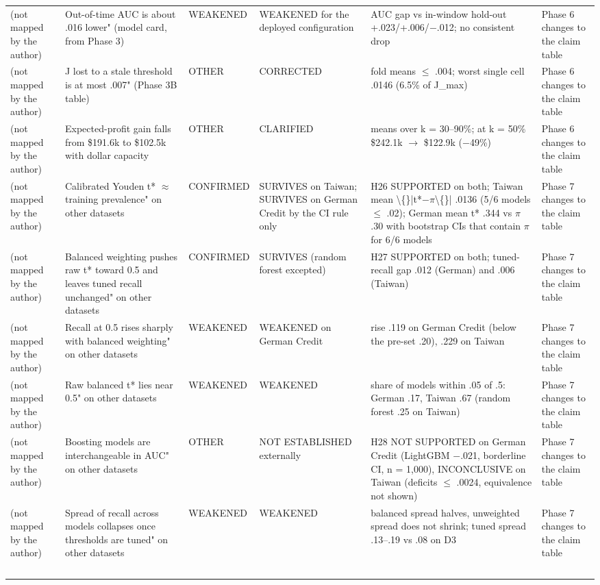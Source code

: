 \begin{table}[t]
\begin{tabular}{lp{5.2cm}lp{5.2cm}p{5.2cm}p{5.2cm}}
(not mapped by the author) & Out-of-time AUC is about .016 lower" (model card, from Phase 3) & WEAKENED & WEAKENED for the deployed configuration & AUC gap vs in-window hold-out +.023/+.006/$-$.012; no consistent drop & Phase 6 changes to the claim table \\
(not mapped by the author) & J lost to a stale threshold is at most .007" (Phase 3B table) & OTHER & CORRECTED & fold means $\leq$ .004; worst single cell .0146 (6.5\% of J\_max) & Phase 6 changes to the claim table \\
(not mapped by the author) & Expected-profit gain falls from \$191.6k to \$102.5k with dollar capacity & OTHER & CLARIFIED & means over k = 30--90\%; at k = 50\% \$242.1k $\to$ \$122.9k ($-$49\%) & Phase 6 changes to the claim table \\
(not mapped by the author) & Calibrated Youden t* $\approx$ training prevalence" on other datasets & CONFIRMED & SURVIVES on Taiwan; SURVIVES on German Credit by the CI rule only & H26 SUPPORTED on both; Taiwan mean \textbackslash\{\}|t*$-$$\pi$\textbackslash\{\}| .0136 (5/6 models $\leq$ .02); German mean t* .344 vs $\pi$ .30 with bootstrap CIs that contain $\pi$ for 6/6 models & Phase 7 changes to the claim table \\
(not mapped by the author) & Balanced weighting pushes raw t* toward 0.5 and leaves tuned recall unchanged" on other datasets & CONFIRMED & SURVIVES (random forest excepted) & H27 SUPPORTED on both; tuned-recall gap .012 (German) and .006 (Taiwan) & Phase 7 changes to the claim table \\
(not mapped by the author) & Recall at 0.5 rises sharply with balanced weighting" on other datasets & WEAKENED & WEAKENED on German Credit & rise .119 on German Credit (below the pre-set .20), .229 on Taiwan & Phase 7 changes to the claim table \\
(not mapped by the author) & Raw balanced t* lies near 0.5" on other datasets & WEAKENED & WEAKENED & share of models within .05 of .5: German .17, Taiwan .67 (random forest .25 on Taiwan) & Phase 7 changes to the claim table \\
(not mapped by the author) & Boosting models are interchangeable in AUC" on other datasets & OTHER & NOT ESTABLISHED externally & H28 NOT SUPPORTED on German Credit (LightGBM $-$.021, borderline CI, n = 1,000), INCONCLUSIVE on Taiwan (deficits $\leq$ .0024, equivalence not shown) & Phase 7 changes to the claim table \\
(not mapped by the author) & Spread of recall across models collapses once thresholds are tuned" on other datasets & WEAKENED & WEAKENED & balanced spread halves, unweighted spread does not shrink; tuned spread .13--.19 vs .08 on D3 & Phase 7 changes to the claim table \\
$$
\end{tabular}
\end{table}
